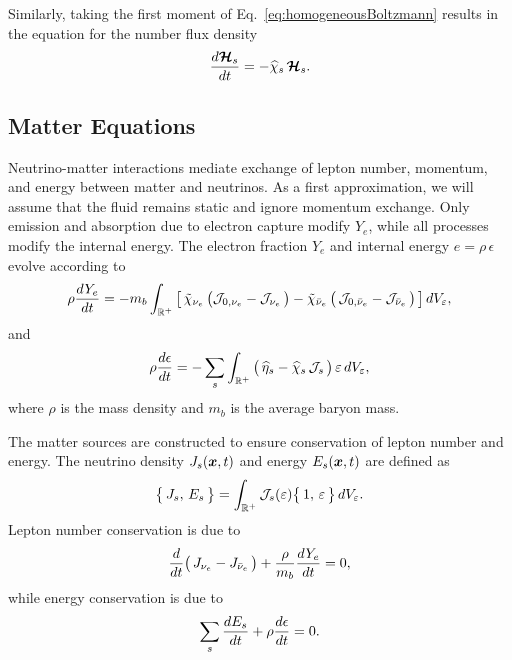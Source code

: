 \documentclass[12pt]{article}
\begin{document}
Similarly, taking the first moment of Eq.~\eqref{eq:homogeneousBoltzmann} results in the equation for the number flux density
\begin{equation}
  \frac{d \boldsymbol{\mathcal{H}}_{s}}{d t}
  =-\widehat{\chi}_{s}\,\boldsymbol{\mathcal{H}}_{s}.
  \label{eq:momentFlux}
\end{equation}

\subsection{Matter Equations}

Neutrino-matter interactions mediate exchange of lepton number, momentum, and energy between matter and neutrinos.  
As a first approximation, we will assume that the fluid remains static and ignore momentum exchange.  
Only emission and absorption due to electron capture modify $Y_{e}$, while all processes modify the internal energy.  
The electron fraction $Y_{e}$ and internal energy $e=\rho\,\epsilon$ evolve according to
\begin{equation}
  \rho\frac{d Y_{e}}{d t}
  =-m_{b}\int_{\mathbb{R}^{+}}
  \big[\,
    \tilde{\chi}_{\nu_{e}}\,\big(\mathcal{J}_{0,\nu_{e}}-\mathcal{J}_{\nu_{e}}\,\big)
    -\tilde{\chi}_{\bar{\nu}_{e}}\,\big(\,\mathcal{J}_{0,\bar{\nu}_{e}}-\mathcal{J}_{\bar{\nu}_{e}}\,\big)
  \,\big]\,dV_{\varepsilon},
\end{equation}
and
\begin{equation}
  \rho\frac{d \epsilon}{d t}
  =-\sum_{s}\int_{\mathbb{R}^{+}}\big(\,\widehat{\eta}_{s} - \widehat{\chi}_{s}\,\mathcal{J}_{s}\,\big)\,\varepsilon\,dV_{\varepsilon},
\end{equation}
where $\rho$ is the mass density and $m_{b}$ is the average baryon mass.  

The matter sources are constructed to ensure conservation of lepton number and energy.  
The neutrino density $J_{s}(\boldsymbol{x},t)$ and energy $E_{s}(\boldsymbol{x},t)$ are defined as
\begin{equation}
  \big\{\,J_{s},\,E_{s}\,\big\}
  =\int_{\mathbb{R}^{+}}\mathcal{J}_{s}(\varepsilon)\big\{\,1,\,\varepsilon\,\big\}\,dV_{\varepsilon}.
\end{equation}
Lepton number conservation is due to
\begin{equation}
  \frac{d }{d t}\big(\,J_{\nu_{e}}-J_{\bar{\nu}_{e}}\,\big)+\frac{\rho}{m_{b}}\frac{d Y_{e}}{d t} = 0,
\end{equation}
while energy conservation is due to
\begin{equation}
  \sum_{s}\frac{d E_{s}}{d t}+\rho\frac{d \epsilon}{d t} = 0.
\end{equation}



\end{document}
